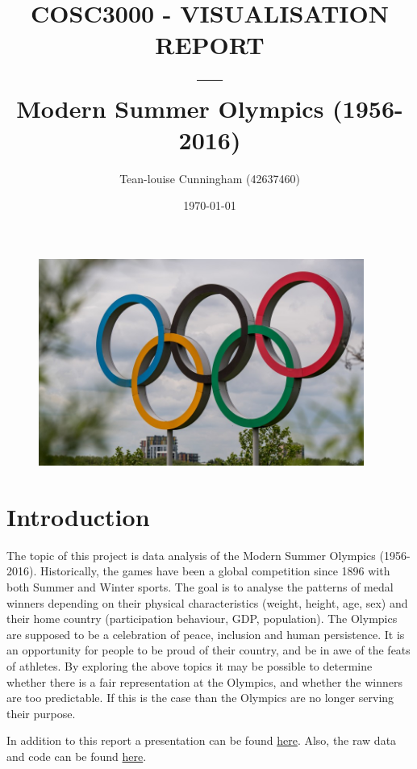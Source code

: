\documentclass[a4 paper, 12pt]{article}
\title{COSC3000 - VISUALISATION REPORT \\ --- \\Modern Summer Olympics (1956-2016)}
\author{Tean-louise Cunningham (42637460)}
\date{\today}
\begin{document}
\maketitle
    \begin{figure} [H]
        \centering
        \includegraphics[width=0.95\textwidth]
            {./images/title.jpg}                  
    \end{figure}  


\pagebreak
\tableofcontents
\pagebreak
\listoffigures

\pagebreak
\section{Introduction}
The topic of this project is data analysis of the Modern Summer Olympics (1956-2016). Historically, the games have been a global competition since 1896 with both Summer and Winter sports. The goal is to analyse the patterns of medal winners depending on their physical characteristics (weight, height, age, sex) and their home country (participation behaviour, GDP, population). The Olympics are supposed to be a celebration of peace, inclusion and human persistence. It is an opportunity for people to be proud of their country, and be in awe of the feats of athletes. By exploring the above topics it may be possible to determine whether there is a fair representation at the Olympics, and whether the winners are too predictable. If this is the case than the Olympics are no longer serving their purpose.

In addition to this report a presentation can be found \href{https://youtu.be/delurBPtI74}{here}. Also, the raw data and code can be found \href{https://drive.google.com/open?id=1YSaKUoQ1eeEgHOvb9ixoedm1HYTRMAKP}{here}.
\end{document}
